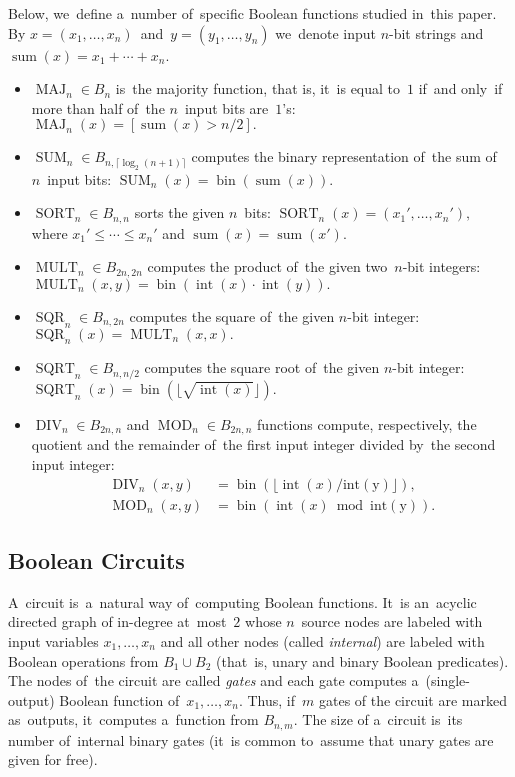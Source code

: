 \documentclass[sigconf, review, anonymous]{acmart}
\begin{document}
Below, we~define a~number of~specific Boolean functions studied in~this paper.
By $x=(x_1,\dotsc, x_n)$~and~$y=(y_1, \dotsc, y_n)$ we~denote input $n$-bit strings
and $\operatorname{sum}(x)=x_1+\dotsb+x_n$.
\begin{itemize}
	\item $\operatorname{MAJ}_n \in B_n$ is~the majority function, that is, it~is equal to~$1$ if~and only~if more than half of~the $n$~input bits are~$1$'s:
	\(\operatorname{MAJ}_n(x)=[\operatorname{sum}(x) > n/2].\)
	\item $\operatorname{SUM}_n \in B_{n, \lceil \log_2(n+1) \rceil}$ computes the binary representation of~the sum of~$n$~input bits:
	\(\operatorname{SUM}_n(x)=\operatorname{bin}(\operatorname{sum}(x)).\)
	\item $\operatorname{SORT}_n \in B_{n,n}$ sorts the given $n$~bits:
	\(\operatorname{SORT}_n(x)=(x_1', \dotsc, x_n'),\)
	where $x_1' \le \dotsb \le x_n'$ and $\operatorname{sum}(x)=\operatorname{sum}(x')$.
	\item $\operatorname{MULT}_n \in B_{2n, 2n}$ computes the product of~the given two~$n$-bit integers:
	\(\operatorname{MULT}_n(x, y)=\operatorname{bin}(\operatorname{int}(x) \cdot \operatorname{int}(y)).\)
	\item $\operatorname{SQR}_n \in B_{n, 2n}$ computes the square of~the given $n$-bit integer:
	\(\operatorname{SQR}_n(x)=\operatorname{MULT}_n(x, x).\)
	\item $\operatorname{SQRT}_n \in B_{n, n/2}$ computes the square root of~the given $n$-bit integer:
	\(\operatorname{SQRT}_n(x)=\operatorname{bin}(\lfloor \sqrt{\operatorname{int}(x)}\rfloor).\)
	\item $\operatorname{DIV}_n \in B_{2n, n}$ and $\operatorname{MOD}_n \in B_{2n, n}$
	functions compute, respectively, the quotient and the remainder of~the first input integer divided by~the second input integer:
	\begin{align*}
		\operatorname{DIV}_n(x,y)&=\operatorname{bin}(\lfloor \operatorname{int}(x) /\operatorname{int(y)}\rfloor),\\
		\operatorname{MOD}_n(x,y)&=\operatorname{bin}(\operatorname{int}(x) \bmod \operatorname{int(y)}).
	\end{align*}
\end{itemize}

\subsection{Boolean Circuits}
A~circuit is~a~natural way of~computing Boolean functions.
It~is an~acyclic directed graph of in-degree at~most~$2$ whose $n$~source
nodes are labeled with input variables
$x_1, \dotsc, x_n$ and all other nodes (called \emph{internal})
are labeled with Boolean operations from
$B_1 \cup B_2$ (that~is, unary and binary Boolean predicates).
The nodes of~the circuit are called \emph{gates} and each gate computes
a~(single-output) Boolean function of~$x_1, \dotsc, x_n$. Thus, if~$m$ gates of the
circuit are marked as~outputs, it~computes a~function from $B_{n,m}$.
The size of a~circuit is~its number of~internal binary gates
(it~is common to~assume that unary gates are given for free).
\end{document}
